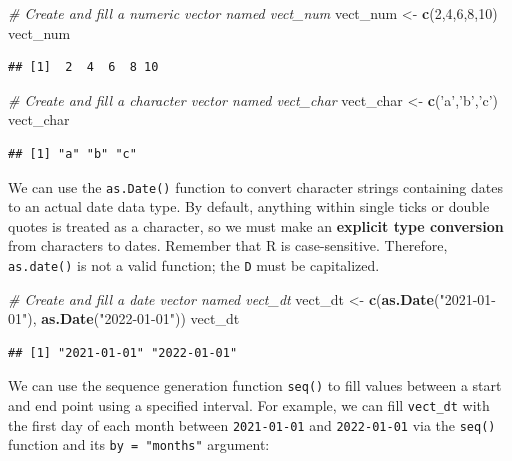 \documentclass[]{book}
\newenvironment{Shaded}{\begin{snugshade}}{\end{snugshade}}
\newcommand{\CommentTok}[1]{\textcolor[rgb]{0.56,0.35,0.01}{\textit{#1}}}
\newcommand{\DecValTok}[1]{\textcolor[rgb]{0.00,0.00,0.81}{#1}}
\newcommand{\KeywordTok}[1]{\textcolor[rgb]{0.13,0.29,0.53}{\textbf{#1}}}
\newcommand{\NormalTok}[1]{#1}
\newcommand{\StringTok}[1]{\textcolor[rgb]{0.31,0.60,0.02}{#1}}
\begin{document}
\begin{Shaded}
\begin{Highlighting}[]
\CommentTok{# Create and fill a numeric vector named vect_num}
\NormalTok{vect_num <-}\StringTok{ }\KeywordTok{c}\NormalTok{(}\DecValTok{2}\NormalTok{,}\DecValTok{4}\NormalTok{,}\DecValTok{6}\NormalTok{,}\DecValTok{8}\NormalTok{,}\DecValTok{10}\NormalTok{)}
\NormalTok{vect_num}
\end{Highlighting}
\end{Shaded}

\begin{verbatim}
## [1]  2  4  6  8 10
\end{verbatim}

\begin{Shaded}
\begin{Highlighting}[]
\CommentTok{# Create and fill a character vector named vect_char}
\NormalTok{vect_char <-}\StringTok{ }\KeywordTok{c}\NormalTok{(}\StringTok{'a'}\NormalTok{,}\StringTok{'b'}\NormalTok{,}\StringTok{'c'}\NormalTok{)}
\NormalTok{vect_char}
\end{Highlighting}
\end{Shaded}

\begin{verbatim}
## [1] "a" "b" "c"
\end{verbatim}

We can use the \texttt{as.Date()} function to convert character strings containing dates to an actual date data type. By default, anything within single ticks or double quotes is treated as a character, so we must make an \textbf{explicit type conversion} from characters to dates. Remember that R is case-sensitive. Therefore, \texttt{as.date()} is not a valid function; the \texttt{D} must be capitalized.

\begin{Shaded}
\begin{Highlighting}[]
\CommentTok{# Create and fill a date vector named vect_dt}
\NormalTok{vect_dt <-}\StringTok{ }\KeywordTok{c}\NormalTok{(}\KeywordTok{as.Date}\NormalTok{(}\StringTok{"2021-01-01"}\NormalTok{), }\KeywordTok{as.Date}\NormalTok{(}\StringTok{"2022-01-01"}\NormalTok{))}
\NormalTok{vect_dt}
\end{Highlighting}
\end{Shaded}

\begin{verbatim}
## [1] "2021-01-01" "2022-01-01"
\end{verbatim}

We can use the sequence generation function \texttt{seq()} to fill values between a start and end point using a specified interval. For example, we can fill \texttt{vect\_dt} with the first day of each month between \texttt{2021-01-01} and \texttt{2022-01-01} via the \texttt{seq()} function and its \texttt{by\ =\ "months"} argument:
\end{document}
